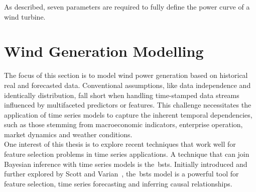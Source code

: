     As described, seven parameters are required to fully define the power curve of a wind turbine.


\section{Wind Generation Modelling}
    \label{sec:wind_generation_modelling}

    The focus of this section is to model wind power generation based on historical real and forecasted data.
    Conventional assumptions, like data independence and identically distribution, fall short when handling time-stamped
    data streams influenced by multifaceted predictors or features.
    This challenge necessitates the application of time series models to capture the inherent temporal dependencies,
    such as those stemming from macroeconomic indicators, enterprise operation, market dynamics and weather conditions.\\

    One interest of this thesis is to explore recent techniques that work well for feature selection problems in
    time series applications.
    A technique that can join Bayesian inference with time series models is the~\gls{bsts}.
    Initially introduced and further explored by Scott and Varian~\cite{scott_predicting_2013, scott_bayesian_2013},
    the~\gls{bsts} model is a powerful tool for feature selection, time series forecasting and inferring causal relationships. \\

